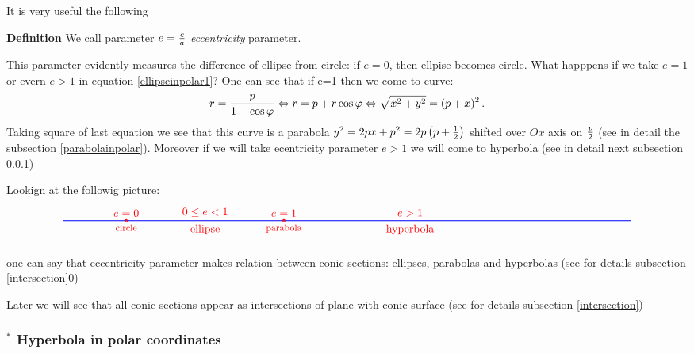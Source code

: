 \documentclass[12pt]{article}
\numberwithin{equation}{section}
\begin{document}
It is very useful the following
\smallskip

{\bf Definition} We call parameter $e={c\over a}$
{\it eccentricity} parameter.

\smallskip

This parameter evidently measures the difference of ellipse from
circle: if $e=0$, then ellpise becomes circle.
What happpens if we take $e=1$ or evern $e>1$ in equation   
\eqref{ellipseinpolar1}?  One can see that if e=1 then
we come to curve:
      \begin{equation}\label{e=1}
r={p\over 1-\cos\varphi}\Leftrightarrow r=p+r\cos\varphi
\Leftrightarrow \sqrt {x^2+y^2}=(p+x)^2\,.
      \end{equation}
Taking square of last equation we see that this curve
is a  parabola 
$y^2=2px+p^2=2p\left(p+{1\over 2}\right)$
shifted over $Ox$ axis on $p\over 2$ (see in detail
the subsection \ref{parabolainpolar}).
Moreover if we will take ecentricity parameter $e>1$
we will come to hyperbola (see in detail next subsection 
\ref{hyperbolainpolar}) 

Lookign at the  followig picture:
  \begin{equation}\label{beautifulpicture}
\begin{tikzpicture}%
\draw [  thick, blue] (-10,0)--(8,0); 
\draw[red,thick] (-8,0) circle (1pt); 
\node [red,above] at (-8, 0) { $e=0$};
\node [red,below] at (-8, 0) {\footnotesize circle};
\node [red,above] at (-5.5,0) { $0\leq e <1$};
\node [red,below] at (-5.5, 0) { ellipse};
\draw[red,thick] (-3,0) circle (1pt); 
\node [red,above] at (-3, 0) { $e=1$};
\node [red,below] at (-3, 0) {\footnotesize parabola};
\node [red,above] at (1, 0) { $e>1$};
\node [red,below] at (1, 0) {hyperbola};
\end{tikzpicture}
\end{equation}

one  can say that eccentricity parameter makes relation
between conic sections: 
ellipses, parabolas and hyperbolas (see for details 
subsection \ref{intersection}0)


Later we will
see that all conic sections appear as intersections of plane
with conic surface (see for details subsection 
\ref{intersection})



\subsubsection{$^*$ Hyperbola in polar coordinates}
\label{hyperbolainpolar}
\end{document}
